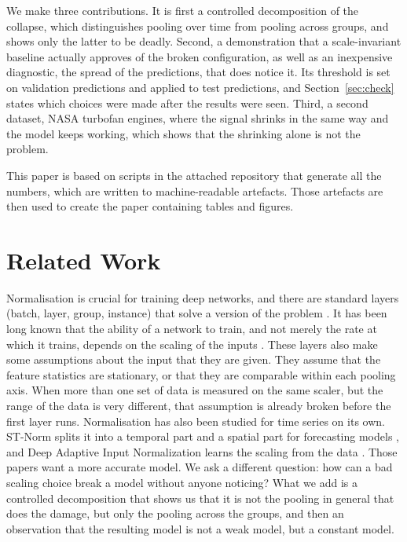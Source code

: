 \documentclass[preprint,12pt,authoryear]{elsarticle}
\begin{document}
We make three contributions. It is first a controlled decomposition of the collapse, which distinguishes pooling over time from pooling across groups, and shows only the latter to be deadly. Second, a demonstration that a scale-invariant baseline actually approves of the broken configuration, as well as an inexpensive diagnostic, the spread of the predictions, that does notice it. Its threshold is set on validation predictions and applied to test predictions, and Section~\ref{sec:check} states which choices were made after the results were seen. Third, a second dataset, NASA turbofan engines, where the signal shrinks in the same way and the model keeps working, which shows that the shrinking alone is not the problem.

This paper is based on scripts in the attached repository that generate all the numbers, which are written to machine-readable artefacts. Those artefacts are then used to create the paper containing tables and figures.

\section{Related Work}
\label{sec:related}

Normalisation is crucial for training deep networks, and there are standard layers (batch, layer, group, instance) that solve a version of the problem \citep{ioffe2015,ba2016,wu2018,ulyanov2016,huang2023}. It has been long known that the ability of a network to train, and not merely the rate at which it trains, depends on the scaling of the inputs \citep{sola1997}. These layers also make some assumptions about the input that they are given. They assume that the feature statistics are stationary, or that they are comparable within each pooling axis. When more than one set of data is measured on the same scaler, but the range of the data is very different, that assumption is already broken before the first layer runs. Normalisation has also been studied for time series on its own. ST-Norm splits it into a temporal part and a spatial part for forecasting models \citep{deng2021}, and Deep Adaptive Input Normalization learns the scaling from the data \citep{passalis2020}. Those papers want a more accurate model. We ask a different question: how can a bad scaling choice break a model without anyone noticing? What we add is a controlled decomposition that shows us that it is not the pooling in general that does the damage, but only the pooling across the groups, and then an observation that the resulting model is not a weak model, but a constant model.
\end{document}
